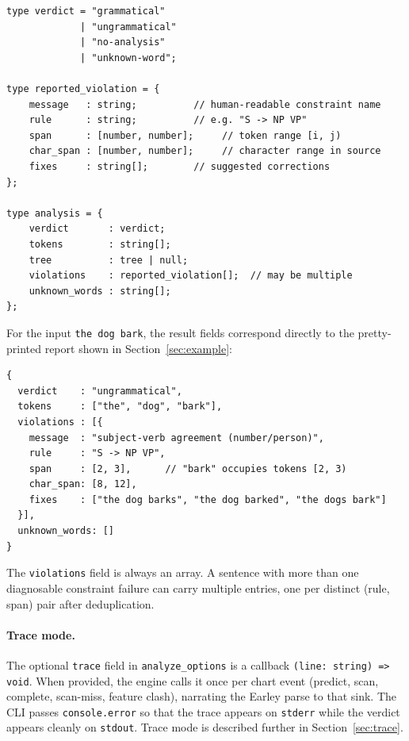 \documentclass[11pt]{article}
\theoremstyle{definition}
\theoremstyle{plain}
\theoremstyle{remark}
\begin{document}
\begin{verbatim}
type verdict = "grammatical"
             | "ungrammatical"
             | "no-analysis"
             | "unknown-word";

type reported_violation = {
    message   : string;          // human-readable constraint name
    rule      : string;          // e.g. "S -> NP VP"
    span      : [number, number];     // token range [i, j)
    char_span : [number, number];     // character range in source
    fixes     : string[];        // suggested corrections
};

type analysis = {
    verdict       : verdict;
    tokens        : string[];
    tree          : tree | null;
    violations    : reported_violation[];  // may be multiple
    unknown_words : string[];
};
\end{verbatim}

For the input \texttt{the dog bark}, the result fields correspond directly to the
pretty-printed report shown in Section~\ref{sec:example}:

\begin{verbatim}
{
  verdict    : "ungrammatical",
  tokens     : ["the", "dog", "bark"],
  violations : [{
    message  : "subject-verb agreement (number/person)",
    rule     : "S -> NP VP",
    span     : [2, 3],      // "bark" occupies tokens [2, 3)
    char_span: [8, 12],
    fixes    : ["the dog barks", "the dog barked", "the dogs bark"]
  }],
  unknown_words: []
}
\end{verbatim}

The \texttt{violations} field is always an array. A sentence with more than one
diagnosable constraint failure can carry multiple entries, one per distinct
(rule, span) pair after deduplication.

\paragraph{Trace mode.}
The optional \texttt{trace} field in \texttt{analyze\_options} is a callback
\texttt{(line: string) => void}. When provided, the engine calls it once per
chart event (predict, scan, complete, scan-miss, feature clash), narrating the
Earley parse to that sink. The CLI passes \texttt{console.error} so that the
trace appears on \texttt{stderr} while the verdict appears cleanly on
\texttt{stdout}. Trace mode is described further in Section~\ref{sec:trace}.
\end{document}
